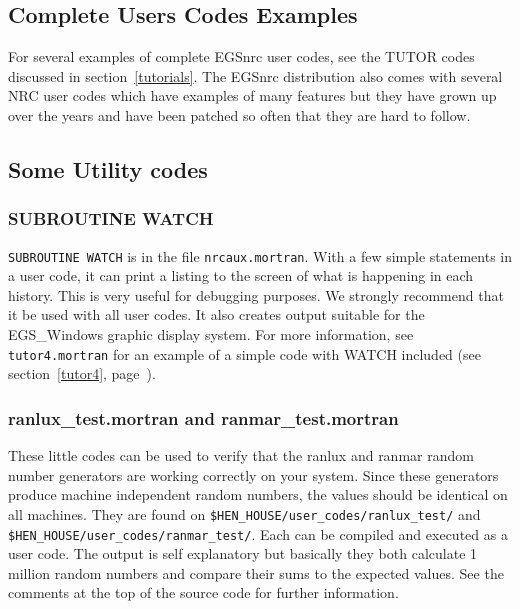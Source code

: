 \subsection{Complete Users Codes Examples}
For several examples of complete EGSnrc user codes, see the TUTOR codes
discussed in section~\ref{tutorials}. The EGSnrc distribution also comes
with several NRC user codes which have examples of many features\cite{Ro00}
but they have grown up over the years and have been patched so often that
they are hard to follow.

\subsection{Some Utility codes}
\subsubsection{SUBROUTINE WATCH}
{\tt SUBROUTINE WATCH} is in the file {\tt nrcaux.mortran}. With a few simple
statements in a user code, it can print a listing to the screen of what is
happening in each history.  This is very useful for debugging purposes. We
strongly recommend that it be used with all user codes.  It also creates
output suitable for the EGS\_Windows graphic display system\cite{TR99a}.
For more information, see {\tt tutor4.mortran} for an example of a simple
code with WATCH included (see section~\ref{tutor4}, page~\pageref{tutor4}).

\subsubsection{ranlux\_test.mortran and ranmar\_test.mortran}
These little codes can be used to verify that the ranlux and
ranmar random number generators are working correctly on your
system. Since these generators produce machine independent
random numbers, the values should be identical on all machines.
They are found on {\tt \$HEN\_HOUSE/user\_codes/ranlux\_test/} and  {\tt
\$HEN\_HOUSE/user\_codes/ranmar\_test/}. Each can be compiled and executed
as a user code.  The output is self explanatory but basically
they both calculate
1 million random numbers and compare their sums to the expected values.
See the comments at the top of the source code for further information.

